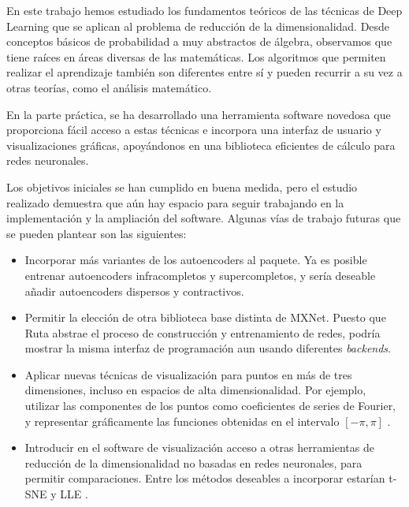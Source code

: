 En este trabajo hemos estudiado los fundamentos teóricos de las técnicas de Deep Learning que se aplican al problema de reducción de la dimensionalidad. Desde conceptos básicos de probabilidad a muy abstractos de álgebra, observamos que tiene raíces en áreas diversas de las matemáticas. Los algoritmos que permiten realizar el aprendizaje también son diferentes entre sí y pueden recurrir a su vez a otras teorías, como el análisis matemático.

En la parte práctica, se ha desarrollado una herramienta software novedosa que proporciona fácil acceso a estas técnicas e incorpora una interfaz de usuario y visualizaciones gráficas, apoyándonos en una biblioteca eficientes de cálculo para redes neuronales.

Los objetivos iniciales se han cumplido en buena medida, pero el estudio realizado demuestra que aún hay espacio para seguir trabajando en la implementación y la ampliación del software. Algunas vías de trabajo futuras que se pueden plantear son las siguientes:
\begin{itemize}
\item Incorporar más variantes de los autoencoders al paquete. Ya es posible entrenar autoencoders infracompletos y supercompletos, y sería deseable añadir autoencoders dispersos y contractivos.
\item Permitir la elección de otra biblioteca base distinta de MXNet. Puesto que Ruta abstrae el proceso de construcción y entrenamiento de redes, podría mostrar la misma interfaz de programación aun usando diferentes \emph{backends}.
\item Aplicar nuevas técnicas de visualización para puntos en más de tres dimensiones, incluso en espacios de alta dimensionalidad. Por ejemplo, utilizar las componentes de los puntos como coeficientes de series de Fourier, y representar gráficamente las funciones obtenidas en el intervalo $[-\pi,\pi]$ \autocite{andrews1972}.
\item Introducir en el software de visualización acceso a otras herramientas de reducción de la dimensionalidad no basadas en redes neuronales, para permitir comparaciones. Entre los métodos deseables a incorporar estarían t-SNE \autocite{maaten2008} y LLE \autocite{roweis2000}.
\end{itemize}